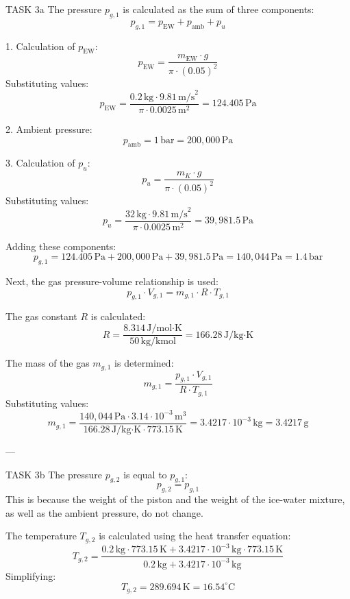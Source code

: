 TASK 3a  
The pressure \( p_{g,1} \) is calculated as the sum of three components:  
\[
p_{g,1} = p_{\text{EW}} + p_{\text{amb}} + p_u
\]  

1. Calculation of \( p_{\text{EW}} \):  
\[
p_{\text{EW}} = \frac{m_{\text{EW}} \cdot g}{\pi \cdot (0.05)^2}
\]  
Substituting values:  
\[
p_{\text{EW}} = \frac{0.2 \, \text{kg} \cdot 9.81 \, \text{m/s}^2}{\pi \cdot 0.0025 \, \text{m}^2} = 124.405 \, \text{Pa}
\]  

2. Ambient pressure:  
\[
p_{\text{amb}} = 1 \, \text{bar} = 200,000 \, \text{Pa}
\]  

3. Calculation of \( p_u \):  
\[
p_u = \frac{m_K \cdot g}{\pi \cdot (0.05)^2}
\]  
Substituting values:  
\[
p_u = \frac{32 \, \text{kg} \cdot 9.81 \, \text{m/s}^2}{\pi \cdot 0.0025 \, \text{m}^2} = 39,981.5 \, \text{Pa}
\]  

Adding these components:  
\[
p_{g,1} = 124.405 \, \text{Pa} + 200,000 \, \text{Pa} + 39,981.5 \, \text{Pa} = 140,044 \, \text{Pa} = 1.4 \, \text{bar}
\]  

Next, the gas pressure-volume relationship is used:  
\[
p_{g,1} \cdot V_{g,1} = m_{g,1} \cdot R \cdot T_{g,1}
\]  

The gas constant \( R \) is calculated:  
\[
R = \frac{8.314 \, \text{J/mol·K}}{50 \, \text{kg/kmol}} = 166.28 \, \text{J/kg·K}
\]  

The mass of the gas \( m_{g,1} \) is determined:  
\[
m_{g,1} = \frac{p_{g,1} \cdot V_{g,1}}{R \cdot T_{g,1}}
\]  
Substituting values:  
\[
m_{g,1} = \frac{140,044 \, \text{Pa} \cdot 3.14 \cdot 10^{-3} \, \text{m}^3}{166.28 \, \text{J/kg·K} \cdot 773.15 \, \text{K}} = 3.4217 \cdot 10^{-3} \, \text{kg} = 3.4217 \, \text{g}
\]  

---

TASK 3b  
The pressure \( p_{g,2} \) is equal to \( p_{g,1} \):  
\[
p_{g,2} = p_{g,1}
\]  
This is because the weight of the piston and the weight of the ice-water mixture, as well as the ambient pressure, do not change.  

The temperature \( T_{g,2} \) is calculated using the heat transfer equation:  
\[
T_{g,2} = \frac{0.2 \, \text{kg} \cdot 773.15 \, \text{K} + 3.4217 \cdot 10^{-3} \, \text{kg} \cdot 773.15 \, \text{K}}{0.2 \, \text{kg} + 3.4217 \cdot 10^{-3} \, \text{kg}}
\]  
Simplifying:  
\[
T_{g,2} = 289.694 \, \text{K} = 16.54^\circ\text{C}
\]  